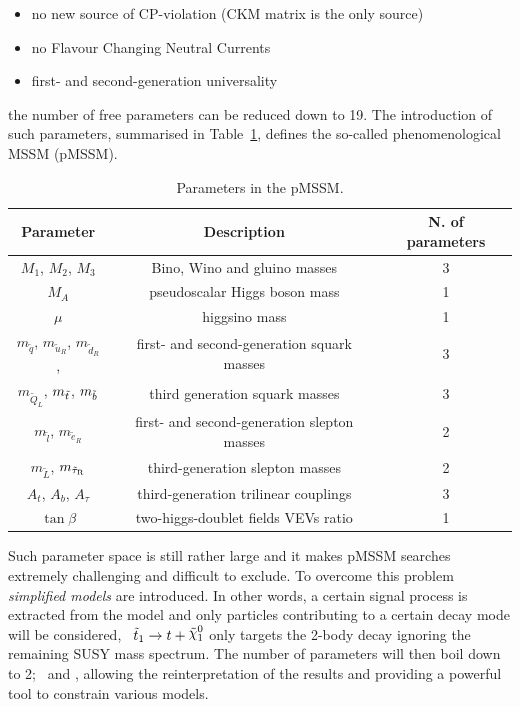 				\begin{itemize}
					\item no new source of CP-violation (CKM matrix is the only source)
					\item no Flavour Changing Neutral Currents
					\item first- and second-generation universality
				\end{itemize}
				
				\noindent the number of free parameters can be reduced down to 19. The introduction of such parameters, summarised in Table~\ref{tab:MSSM_mainFreePar}, defines the so-called phenomenological MSSM (pMSSM).
				
				\begin{table}[!htb]\centering\caption{Parameters in the pMSSM.}
					\begin{tabular}{c|c|c}
					\hline
					\textbf{Parameter} & \textbf{Description} & \textbf{N. of parameters} \\ \hline \hline

					$M_1$, $M_2$, $M_3$ & Bino, Wino and gluino masses & 3 \\ \hline

					$M_{A}$	& pseudoscalar Higgs boson mass	& 1 \\\hline
					$\mu$  & higgsino mass & 1 \\\hline

					$m_{\tilde{q}}$, $m_{\tilde{u}_R}$, $m_{\tilde{d}_R}$, & first- and second-generation squark masses & 3 \\
					$m_{\tilde{Q}_L}$, $m_{\tilde{t}}$, $m_{\tilde{b}}$ & third generation squark masses	&  3 \\\hline

					$m_{\tilde{l}}$, $m_{\tilde{e}_R}$ & first- and second-generation slepton masses	 & 2 \\
					$m_{\tilde{L}}$, $m_{\tilde{\tau}_{\mathrm{R}}}$ & third-generation slepton masses	& 2 \\\hline

					$A_t$, $A_b$, $A_{\tau}$ & third-generation trilinear couplings	& 3 \\\hline

					$\tan \beta$ & two-higgs-doublet fields VEVs ratio & 1 \\ 
					\hline
					\end{tabular}
				\label{tab:MSSM_mainFreePar} 
				\end{table}

				\noindent Such parameter space is still rather large and it makes pMSSM searches extremely challenging and difficult to exclude. To overcome this problem \textit{simplified models} are introduced. In other words, a certain signal process is extracted from the model and only particles contributing to a certain decay mode will be considered, \eg\ $\stopone \ra t + \ninoone$ only targets the 2-body decay ignoring the remaining SUSY mass spectrum. The number of parameters will then boil down to 2; \mstop\ and \mLSP, allowing the reinterpretation of the results and providing a powerful tool to constrain various models. 

